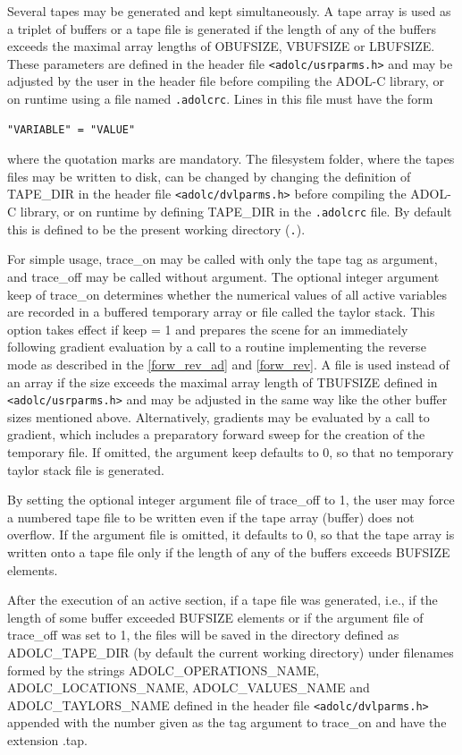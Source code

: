 \documentclass[11pt,twoside]{article}
\begin{document}
Several tapes may be generated and kept simultaneously.
A tape array is used as a triplet of buffers or a tape file is generated if
the length of any of the buffers exceeds the maximal array lengths of 
{\sf OBUFSIZE}, {\sf VBUFSIZE} or {\sf LBUFSIZE}. These parameters are
defined in the header file \verb=<adolc/usrparms.h>=
and may be adjusted by the user in the header file before compiling
the ADOL-C library, or on runtime using a file named \verb=.adolcrc=. 
Lines in this file must have the form
\begin{verbatim}
"VARIABLE" = "VALUE"
\end{verbatim}
where the quotation marks are mandatory.
The filesystem folder, where the tapes files may be written to disk, 
can be changed by changing the definition of {\sf TAPE\_DIR} in
the header file \verb=<adolc/dvlparms.h>= before 
compiling the ADOL-C library, or on runtime by defining {\sf
  TAPE\_DIR} in the \verb=.adolcrc= file. By default this is defined
to be the present working directory (\verb=.=).

For simple usage, {\sf trace\_on} may be called with only the tape
{\sf tag} as argument, and {\sf trace\_off} may be called 
without argument. The optional integer argument {\sf keep} of 
{\sf trace\_on} determines whether the numerical values of all
active variables are recorded in a buffered temporary array or file
called the taylor stack. 
This option takes effect if
{\sf keep} = 1 and prepares the scene for an immediately following
gradient evaluation by a call to a routine implementing the reverse mode
as described in the \autoref{forw_rev_ad} and \autoref{forw_rev}. A
file is used instead of an array if the size exceeds the maximal array
length of {\sf TBUFSIZE} defined in \verb=<adolc/usrparms.h>= and may
be adjusted in the same way like the other buffer sizes mentioned above.
Alternatively, gradients may be evaluated by a call
to {\sf gradient}, which includes a preparatory forward sweep
for the creation of the temporary file. If omitted, the argument 
{\sf  keep} defaults to 0, so that no temporary
taylor stack file is generated. 

By setting the optional integer argument {\sf file} of 
{\sf  trace\_off} to 1, the user may force a numbered  tape
file to be written even if the tape array (buffer) does not overflow.
If the argument {\sf file} is omitted, it 
defaults to 0, so that the tape array is written onto a tape file only 
if the length of any of the buffers exceeds {\sf [OLVT]BUFSIZE} elements.

After the execution of an active section, if a tape file was generated, i.e.,
if the length of some buffer exceeded {\sf [OLVT]BUFSIZE} elements or if the 
argument {\sf file} of {\sf trace\_off} was set to 1, the files will be
saved in the directory defined as {\sf ADOLC\_TAPE\_DIR} (by default
the current working directory) under filenames formed by 
the strings {\sf ADOLC\_OPERATIONS\_NAME}, {\sf
  ADOLC\_LOCATIONS\_NAME}, {\sf ADOLC\_VALUES\_NAME} and {\sf
  ADOLC\_TAYLORS\_NAME} defined in
the header file \verb=<adolc/dvlparms.h>= appended with the number
given as the {\sf tag} argument to {\sf trace\_on} and have the
extension {\sf .tap}.
\end{document}
